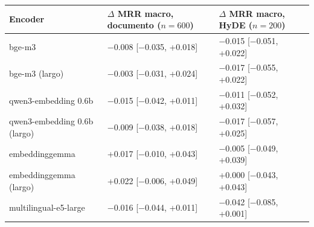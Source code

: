 \begin{tabular}{lll}
\toprule
Encoder & $\Delta$ MRR macro, documento ($n=600$) & $\Delta$ MRR macro, HyDE ($n=200$) \\
\midrule
bge-m3 & $-$0.008 [$-$0.035, +0.018] & $-$0.015 [$-$0.051, +0.022] \\
bge-m3 (largo) & $-$0.003 [$-$0.031, +0.024] & $-$0.017 [$-$0.055, +0.022] \\
qwen3-embedding 0.6b & $-$0.015 [$-$0.042, +0.011] & $-$0.011 [$-$0.052, +0.032] \\
qwen3-embedding 0.6b (largo) & $-$0.009 [$-$0.038, +0.018] & $-$0.017 [$-$0.057, +0.025] \\
embeddinggemma & +0.017 [$-$0.010, +0.043] & $-$0.005 [$-$0.049, +0.039] \\
embeddinggemma (largo) & +0.022 [$-$0.006, +0.049] & +0.000 [$-$0.043, +0.043] \\
multilingual-e5-large & $-$0.016 [$-$0.044, +0.011] & $-$0.042 [$-$0.085, +0.001] \\
\bottomrule
\end{tabular}
